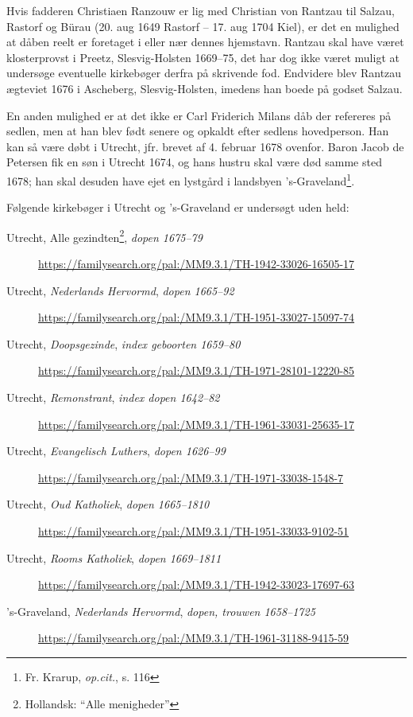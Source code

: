 \documentclass[
	a4paper,
	12pt,
	final
]{memoir}
\begin{document}
Hvis fadderen Christiaen Ranzouw er lig med Christian von Rantzau til Salzau, Rastorf og Bürau (20. aug 1649 Rastorf -- 17. aug 1704 Kiel), er det en mulighed at dåben reelt er foretaget i eller nær dennes hjemstavn. Rantzau skal have været klosterprovst i Preetz, Slesvig-Holsten 1669--75, det har dog ikke været muligt at undersøge eventuelle kirkebøger derfra på skrivende fod. Endvidere blev Rantzau ægteviet 1676 i Ascheberg, Slesvig-Holsten, imedens han boede på godset Salzau.

En anden mulighed er at det ikke er Carl Friderich Milans dåb der refereres på sedlen, men at han blev født senere og opkaldt efter sedlens hovedperson. Han kan så være døbt i Utrecht, jfr. brevet af 4. februar 1678 ovenfor. Baron Jacob de Petersen fik en søn i Utrecht 1674, og hans hustru skal være død samme sted 1678; han skal desuden have ejet en lystgård i landsbyen 's-Graveland\footnote{Fr. Krarup, \emph{op.cit.}, s. 116}.

Følgende kirkebøger i Utrecht og 's-Graveland er undersøgt uden held:

\begin{description}
\item[Utrecht, Alle gezindten\footnote{Hollandsk: \enquote{Alle menigheder}}, \emph{dopen 1675--79}]

	\url{https://familysearch.org/pal:/MM9.3.1/TH-1942-33026-16505-17}
\item[Utrecht, \emph{Nederlands Hervormd}, \emph{dopen 1665--92}]
	\url{https://familysearch.org/pal:/MM9.3.1/TH-1951-33027-15097-74}
\item[Utrecht, \emph{Doopsgezinde}, \emph{index geboorten 1659--80}]
	\url{https://familysearch.org/pal:/MM9.3.1/TH-1971-28101-12220-85}
\item[Utrecht, \emph{Remonstrant}, \emph{index dopen 1642--82}]
	\url{https://familysearch.org/pal:/MM9.3.1/TH-1961-33031-25635-17}
\item[Utrecht, \emph{Evangelisch Luthers}, \emph{dopen 1626--99}]
	\url{https://familysearch.org/pal:/MM9.3.1/TH-1971-33038-1548-7}
\item[Utrecht, \emph{Oud Katholiek}, \emph{dopen 1665--1810}]
	\url{https://familysearch.org/pal:/MM9.3.1/TH-1951-33033-9102-51}
\item[Utrecht, \emph{Rooms Katholiek}, \emph{dopen 1669--1811}]
	\url{https://familysearch.org/pal:/MM9.3.1/TH-1942-33023-17697-63}
\item['s-Graveland, \emph{Nederlands Hervormd}, \emph{dopen, trouwen 1658--1725}]
	\url{https://familysearch.org/pal:/MM9.3.1/TH-1961-31188-9415-59}
\end{description}
\end{document}
